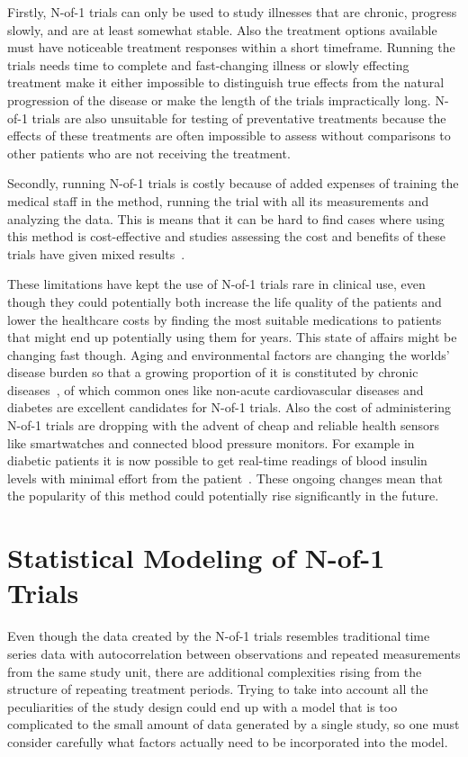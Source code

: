 \documentclass[12pt,a4paper,leqno]{report}
\theoremstyle{plain}
\theoremstyle{definition}
\theoremstyle{remark}
\begin{document}
Firstly, N-of-1 trials can only be used to study illnesses that are chronic,
progress slowly, and are at least somewhat stable. Also the treatment options
available must have noticeable treatment responses within a short timeframe.
Running the trials needs time to complete and fast-changing illness or slowly
effecting treatment make it either impossible to distinguish true effects from
the natural progression of the disease or make the length of the trials
impractically long. N-of-1 trials are also unsuitable for testing of
preventative treatments because the effects of these treatments are often
impossible to assess without comparisons to other patients who are not receiving
the treatment.\ \cite{nofone}

Secondly, running N-of-1 trials is costly because of added expenses of training
the medical staff in the method, running the trial with all its measurements and
analyzing the data. This is means that it can be hard to find cases where using
this method is cost-effective and studies assessing the cost and benefits of these trials
have given mixed results\ \cite{costs}.

These limitations have kept the use of N-of-1 trials rare in clinical use, even
though they could potentially both increase the life quality of the patients and
lower the healthcare costs by finding the most suitable medications to patients that
might end up potentially using them for years. This state of affairs might be
changing fast though. Aging and environmental factors are changing the worlds'
disease burden so that a growing proportion of it is constituted by chronic
diseases\ \cite{diseaseburden}, of which common ones like non-acute cardiovascular
diseases and diabetes are excellent candidates for N-of-1 trials. Also the cost
of administering N-of-1 trials are dropping with the advent of cheap and reliable
health sensors like smartwatches and connected blood pressure monitors. For
example in diabetic patients it is now possible to get real-time readings of
blood insulin levels with minimal effort from the patient\ \cite{cgm}. These
ongoing changes mean that the popularity of this method could potentially rise
significantly in the future.

\chapter{Statistical Modeling of N-of-1 Trials}\label{modeling}

Even though the data created by the N-of-1 trials resembles traditional time
series data with autocorrelation between observations and repeated measurements
from the same study unit, there are additional complexities rising from the structure of
repeating treatment periods. Trying to take into account all
the peculiarities of the study design could end up with a model that is too complicated to
the small amount of data generated by a single study, so one must consider
carefully what factors actually need to be incorporated into the model.
\end{document}
